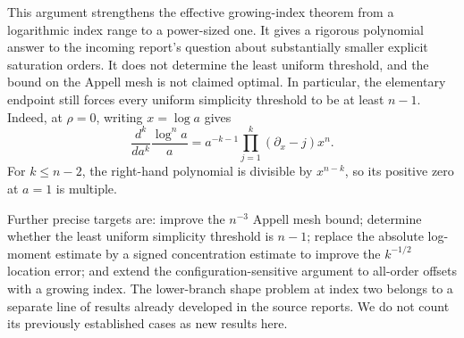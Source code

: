 This argument strengthens the effective growing-index theorem from a
logarithmic index range to a power-sized one. It gives a rigorous
polynomial answer to the incoming report's question about substantially
smaller explicit saturation orders. It does not determine the least
uniform threshold, and the bound on the Appell mesh is not claimed
optimal. In particular, the elementary endpoint still forces every
uniform simplicity threshold to be at least $n-1$.
Indeed, at $\rho=0$, writing $x=\log a$ gives
\[
 \frac{d^k}{da^k}\frac{\log^n a}{a}
   =a^{-k-1}\prod_{j=1}^k(\partial_x-j)x^n.
\]
For $k\le n-2$, the right-hand polynomial is divisible by
$x^{n-k}$, so its positive zero at $a=1$ is multiple.

Further precise targets are: improve the $n^{-3}$ Appell mesh bound;
determine whether the least uniform simplicity threshold is $n-1$;
replace the absolute log-moment estimate by a signed concentration
estimate to improve the $k^{-1/2}$ location error; and extend the
configuration-sensitive argument to all-order offsets with a growing
index. The lower-branch shape problem at index two belongs to a separate
line of results already developed in the source reports. We do not
count its previously established cases as new results here.

